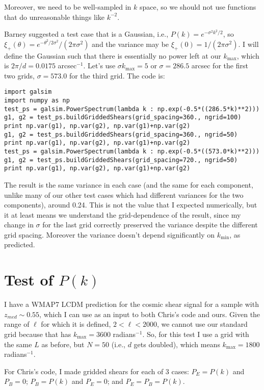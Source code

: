\documentclass[preprint]{aastex}
\newcommand{\kmax}{\ensuremath{k_\mathrm{max}}}
\newcommand{\kmin}{\ensuremath{k_\mathrm{min}}}
\begin{document}
Moreover, we need to be well-sampled in $k$ space, so we should not
use functions that do unreasonable things like $k^{-2}$.

Barney suggested a test case that is a Gaussian, i.e., $P(k) =
e^{-\sigma^2 k^2 / 2}$, so $\xi_+(\theta) =
e^{-\theta^2/2\sigma^2}/(2 \pi \sigma^2)$ and the variance may be
$\xi_+(0)=1/(2\pi\sigma^2)$.  I will define the Gaussian such that
there is essentially no power left at our \kmax, which is
$2\pi/d=0.0175$ arcsec$^{-1}$.  Let's use $\sigma \kmax=5$ or
$\sigma=286.5$ arcsec for the first two grids, $\sigma=573.0$ for the
third grid.  The code is:
\begin{verbatim}
import galsim
import numpy as np
test_ps = galsim.PowerSpectrum(lambda k : np.exp(-0.5*((286.5*k)**2)))
g1, g2 = test_ps.buildGriddedShears(grid_spacing=360., ngrid=100)
print np.var(g1), np.var(g2), np.var(g1)+np.var(g2)
g1, g2 = test_ps.buildGriddedShears(grid_spacing=360., ngrid=50)
print np.var(g1), np.var(g2), np.var(g1)+np.var(g2)
test_ps = galsim.PowerSpectrum(lambda k : np.exp(-0.5*((573.0*k)**2)))
g1, g2 = test_ps.buildGriddedShears(grid_spacing=720., ngrid=50)
print np.var(g1), np.var(g2), np.var(g1)+np.var(g2)
\end{verbatim}

The result is the same variance in each case (and the same for each
component, unlike many of our other test cases which had different
variances for the two components), around 0.24.  This is not the value
that I expected numerically, but it at least means we understand the
grid-dependence of the result, since my change in $\sigma$ for the
last grid correctly preserved the variance despite the different grid
spacing.  Moreover the variance doesn't depend significantly on \kmin,
as predicted.

\section{Test of $P(k)$}

I have a WMAP7 LCDM prediction for the cosmic shear signal for a
sample with $z_{med}\sim 0.55$, which I can use as an input to both
Chris's code and ours.  Given the range of $\ell$ for which it is
defined, $2<\ell<2000$, we cannot use our standard grid because that
has $\kmax=3600$ radians$^{-1}$.  So, for this test I use a grid with
the same $L$ as before, but $N=50$ (i.e., $d$ gets doubled), which
means $\kmax=1800$ radians$^{-1}$.

For Chris's code, I made gridded shears for each of 3 cases:
$P_E=P(k)$ and $P_B=0$; $P_B=P(k)$ and $P_E=0$; and $P_E=P_B=P(k)$.
\end{document}
